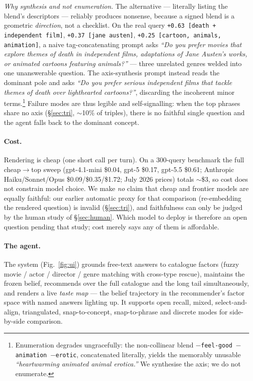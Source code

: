 \documentclass[11pt]{article}
\begin{document}
\emph{Why synthesis and not enumeration.} The alternative --- literally listing the blend's descriptors --- reliably
produces nonsense, because a signed blend is a geometric \emph{direction}, not a checklist. On the real query
\texttt{+0.63\,[death\,+\,independent film]}, \texttt{+0.37\,[jane austen]}, \texttt{+0.25\,[cartoon, animals, animation]},
a naive tag-concatenating prompt asks \emph{``Do you prefer movies that explore themes of death in independent films,
adaptations of Jane Austen's works, or animated cartoons featuring animals?''} --- three unrelated genres welded into
one unanswerable question. The axis-synthesis prompt instead reads the dominant pole and asks \emph{``Do you prefer
serious independent films that tackle themes of death over lighthearted cartoons?''}, discarding the incoherent minor
terms.\footnote{Enumeration degrades ungracefully: the non-collinear blend \texttt{$-$feel-good $-$animation $-$erotic},
concatenated literally, yields the memorably unusable \emph{``heartwarming animated animal erotica.''} We synthesise the
axis; we do not enumerate.} Failure modes are thus legible and self-signalling: when the top phrases share no axis
(\S\ref{sec:tri}, $\sim$10\% of triples), there is no faithful single question and the agent falls back to the dominant
concept.

\paragraph{Cost.} Rendering is cheap (one short call per turn). On a 300-query benchmark the full cheap$\to$top sweep
(gpt-4.1-mini \$0.04, gpt-5 \$0.17, gpt-5.5 \$0.61; Anthropic Haiku/Sonnet/Opus \$0.09/\$0.35/\$1.72; July 2026 prices)
totals $\sim$\$3, so cost does not constrain model choice. We make \emph{no} claim that cheap and frontier models are
equally faithful: our earlier automatic proxy for that comparison (re-embedding the rendered question) is invalid
(\S\ref{sec:tri}), and faithfulness can only be judged by the human study of \S\ref{sec:human}. Which model to deploy
is therefore an open question pending that study; cost merely says any of them is affordable.

\paragraph{The agent.} The system (Fig.~\ref{fig:ui}) grounds free-text answers to catalogue factors (fuzzy movie /
actor / director / genre matching with cross-type rescue), maintains the frozen belief, recommends over the full
catalogue and the long tail simultaneously, and renders a live \emph{taste map} --- the belief trajectory in the
recommender's factor space with named answers lighting up. It supports open recall, mixed, select-and-align,
triangulated, snap-to-concept, snap-to-phrase and discrete modes for side-by-side comparison.
\end{document}
